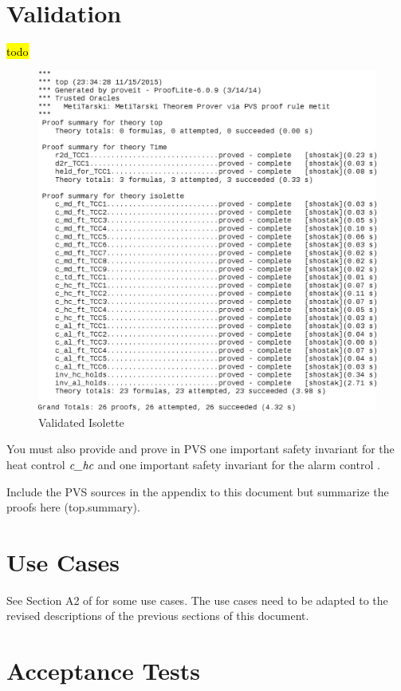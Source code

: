 \documentclass[fontsize=12pt,paper=letter,twoside]{scrartcl}
\begin{document}
\section{Validation}
\hl{todo}
\begin{figure}[!htb]
\begin{center}
\includegraphics[width=1\textwidth]{pics/top.png}
\end{center}
\caption{Validated Isolette}
\label{proofs}
\end{figure}


You must also provide and prove in PVS one important safety invariant for the heat control $\textit{c\_hc}$ and one important safety invariant for the alarm control .

Include the PVS sources in the appendix to this document but summarize the proofs here (top.summary).

\newpage 
\section{Use Cases}

See Section A2 of \cite{REMH} for some use cases. The use cases need to be adapted to the revised descriptions of the previous sections of this document.

\section{Acceptance Tests}
\end{document}
